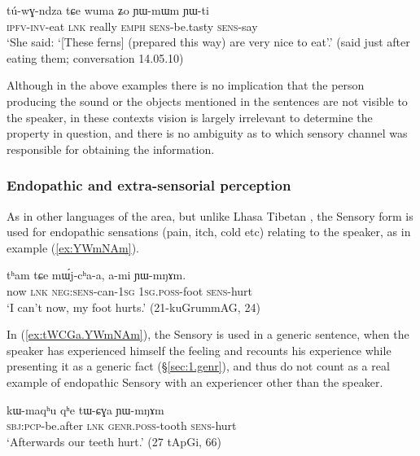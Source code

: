 \begin{exe}
\ex \label{ex:YWmWm}
\gll tú-wɣ-ndza tɕe wuma ʑo ɲɯ-mɯm ɲɯ-ti \\
\textsc{ipfv}-\textsc{inv}-eat \textsc{lnk} really \textsc{emph} \textsc{sens}-be.tasty \textsc{sens}-say \\
\glt `She said: `[These ferns] (prepared this way) are very nice to eat'.' (said just after eating them; conversation 14.05.10)
\end{exe}

Although in the above examples there is no implication that the person producing the sound or the objects mentioned in the sentences are not visible to the speaker, in these contexts vision is largely irrelevant to determine the property in question, and there is no ambiguity as to which sensory channel was responsible for obtaining the information.  


\subsubsection{Endopathic and extra-sensorial perception} \label{sec:sensory.endopathic}
As in other languages of the area, but unlike Lhasa Tibetan \citep{tournadre14evidentiality}, the Sensory form is used for endopathic sensations (pain, itch, cold etc)  relating to the speaker, as in example (\ref{ex:YWmNAm}).

\begin{exe}
\ex \label{ex:YWmNAm}
\gll tʰam tɕe mɯ́j-cʰa-a, a-mi ɲɯ-mŋɤm. \\
now \textsc{lnk} \textsc{neg}:\textsc{sens}-can-\textsc{1sg} \textsc{1sg}.\textsc{poss}-foot \textsc{sens}-hurt \\
\glt `I can't now, my foot hurts.' (21-kuGrummAG, 24)
\end{exe}


In (\ref{ex:tWCGa.YWmNAm}), the Sensory is used in a generic sentence, when the speaker has experienced himself the feeling and recounts his experience while presenting it as a generic fact (§\ref{sec:1.genr}), and thus do not count as a real example of endopathic Sensory with an experiencer other than the speaker.

\begin{exe}
\ex \label{ex:tWCGa.YWmNAm}
\gll kɯ-maqʰu qʰe tɯ-ɕɣa ɲɯ-mŋɤm \\
\textsc{sbj}:\textsc{pcp}-be.after \textsc{lnk} \textsc{genr}.\textsc{poss}-tooth \textsc{sens}-hurt \\
\glt `Afterwards our teeth hurt.' (27 tApGi, 66)
\end{exe}

